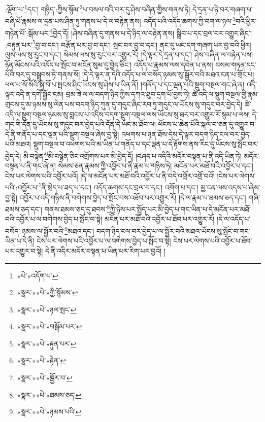 :ལྡོག་པ་\footnote{«པེ་»འདོག་པ་}དང་། གཉིད་:ཀྱིས་སྙོམ་\footnote{«སྣར་»«པེ་»ཀྱི་སྙོམས་}པ་བསལ་བའི་བར་དུ་ཤེས་བཞིན་གྱིས་གནས་ཏེ། དེ་དྲན་པ་ཉེ་བར་གཞག་པ་བཞི་པོ་རྣམས་ལ་དྲན་པས་ཤིན་ཏུ་གནས་པ་དེ་ལ་བརྟེན་ནས། འདོད་པའི་འདོད་ཆགས་ཀྱི་བག་ལ་ཉལ་\footnote{«སྣར་»«པེ་»ཉལ་སྤང་}བའི་ཕྱིར་གཉེན་པོ་:སྒོམ་པར་\footnote{«སྣར་»«པེ་»བསྒོམ་པར་}བྱེད་དོ། །ཤེས་བཞིན་དུ་གནས་པ་དེ་ཉིད་ལ་བརྟེན་ནས། སྒྲིབ་པ་དང་བྲལ་བར་འགྱུར་ཞིང་། :བརྟུན་པར་\footnote{«སྣར་»«པེ་»རྟུན་པར་}བྱ་བ་དང་། བརྩོན་པར་བྱ་བ་དང་། སྤང་བར་བྱ་བ་དང་། ནང་དུ་ཡང་དག་གཞག་པར་བྱ་བའི་ཕྱིར། ལུས་ལས་སུ་རུང་བ་དང་། སེམས་ལས་སུ་རུང་བར་འགྱུར་རོ། །དེ་ལྟར་དེ་དྲན་པ་དང་། ཤེས་བཞིན་ལ་བརྟེན་པས། ཉོན་མོངས་པའི་འདོད་པ་སྤོང་བ་མངོན་སུམ་དུ་བྱེད་ཅིང་། འདོད་པ་རྣམས་ལས་དབེན་པ་ནས། བསམ་གཏན་དང་པོའི་བར་དུ་བསྒྲུབས་ཏེ་གནས་སོ། །དེ་དེ་ལྟར་ན་དེའི་འདོད་པ་ལ་བསོད་ཉམས་སུ་སྦྱོར་བའི་མཐའ་ངན་པ་གྲོང་པ། ཕལ་པ་སོ་སོའི་སྐྱེ་བོ་པ་སྤངས་ཤིང་ཡོངས་སུ་ཤེས་པ་ཡིན་ནོ། །གནོད་པ་དང་ལྡན་པའི་སྡུག་བསྔལ་གང་ཞེ་ན། འདི་ལྟར་འདི་ན་དགེ་སྦྱོང་ངམ། བྲམ་ཟེ་ལ་ལ་བདག་ཉིད་ཀྱིས་དཀའ་ཐུབ་དྲག་པོ་བྱས་ཏེ། ཚེ་འདི་ལ་སྡུག་བསྔལ་གྱི་རྣམ་གྲངས་དུ་མ་ཉམས་སུ་ལེན་པས་བདག་ཉིད་ཀུན་དུ་གདུང་ཞིང་རབ་ཏུ་གདུང་ལ་ཡོངས་སུ་གདུང་བར་བྱེད་དེ། ཚེ་འདི་ལ་སྡུག་བསྔལ་ཉམས་སུ་བླངས་པ་འདིས་བདག་སྡུག་བསྔལ་ལས་ཡོངས་སུ་ཐར་བར་འགྱུར་རོ་སྙམ་པ་ལས། དེ་གང་གི་དོན་དུ་ཡོངས་སུ་གདུང་བར་བྱེད་པའི་དོན་དེ་ཡང་མ་ཐོབ་ལ། ཕོངས་པ་ཆེན་པོའི་སྐལ་བ་ཅན་དུ་འགྱུར་བ་དེ་ནི་གནོད་པ་དང་ལྡན་པའི་སྡུག་བསྔལ་ཞེས་བྱ་སྟེ། འཕགས་པ་ཉན་ཐོས་དེས་དེ་ལྟར་བདག་ཉིད་ངལ་བར་བྱེད་པའི་མཐའ། སྡུག་བསྔལ་བ་འཕགས་པའི་མ་ཡིན་པ་གནོད་པ་དང་ལྡན་པ་དེ་རྟོགས་ནས་རིང་དུ་ཡོངས་སུ་སྤོང་བར་བྱེད་དེ། མི་བསྟེན་\footnote{«སྣར་»«པེ་»རྟེན་}མི་བསྙེན་ཅིང་འགྲོགས་པར་མི་བྱེད་དོ། །བཤད་པ་འདིའི་མདོར་བསྟན་པ་ནི་འདི་ཡིན་ཏེ། མདོར་བསྟན་པ་ནི་གང་ཞེ་ན། སེམས་ཅན་རྣམས་ཀྱི་འབྱོར་པ་ནི་རྣམ་པ་གཉིས་ཏེ། མངོན་པར་མཐོ་བའི་འབྱོར་པ་དང་། ངེས་པར་ལེགས་པའི་འབྱོར་པའོ། །དེ་ལ་མངོན་པར་མཐོ་བའི་འབྱོར་པ་ནི་བདེ་འགྲོར་འགྲོ་བའོ། །ངེས་པར་ལེགས་པའི་:འབྱོར་པ་\footnote{«སྣར་»«པེ་»སྦྱོར་བ་}ནི་སྲེད་པ་ཟད་པ་དང་། འདོད་ཆགས་དང་བྲལ་བ་དང་། འགོག་པ་དང་། མྱ་ངན་ལས་འདས་པ་ཞེས་བྱ་སྟེ། འབྱོར་པ་འདི་གཉིས་ནི་བགེགས་བྱེད་པ་སྤོང་བས་འཐོབ་པར་འགྱུར་རོ། །དེ་ལ་རྣམ་པ་ཐམས་ཅད་དང་། གཞི་ཐམས་ཅད་དང་། གནས་ཐམས་ཅད་དུ་ཐབས་\footnote{«སྣར་»«པེ་»ཐམས་ཅད་}ཀྱི་ཉེས་པར་སྤྱོད་པར་མི་བྱེད་པ་གང་ཡིན་པ་དེ་མངོན་པར་མཐོ་བའི་འབྱོར་པ་ལ་བགེགས་བྱེད་པ་སྤོང་བ་སྟེ། མངོན་པར་མཐོ་བའི་འབྱོར་པ་ཐོབ་པར་འགྱུར་རོ། །དེ་ལ་འདོད་པ་བསོད་:ཉམས་ལ་སྦྱོར་བའི་\footnote{«སྣར་»«པེ་»ཉམས་པའི་}མཐའ་དང་། བདག་ཉིད་ངལ་བར་བྱེད་པ་ལ་སྦྱོར་བའི་མཐའ་ཡོངས་སུ་སྤོང་བ་གང་ཡིན་པ་དེ་ནི། ངེས་པར་ལེགས་པའི་འབྱོར་པ་ལ་བགེགས་བྱེད་པ་སྤོང་བ་སྟེ། ངེས་པར་ལེགས་པའི་འབྱོར་པ་ཐོབ་པར་འགྱུར་བ་སྟེ། དེ་ནི་འདིར་མདོར་བསྟན་པ་ཡིན་པར་རིག་པར་བྱའོ། །
